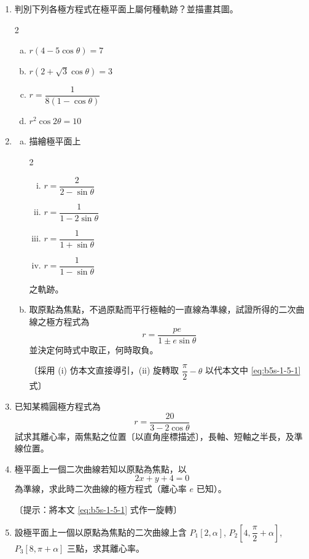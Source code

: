 \begin{enumerate}[1.]
  \item 判別下列各極方程式在極平面上屬何種軌跡？並描畫其圖。
  \begin{multicols}{2}
  \begin{enumerate}[(a)]
    \item $r(4 - 5\cos\theta) = 7$
    \item $r(2 + \sqrt{3}\cos\theta) = 3$
    \item $r = \dfrac{1}{8(1 - \cos\theta)}$
    \item $r^2\cos 2\theta = 10$
  \end{enumerate}
  \end{multicols}

  \item
  \begin{enumerate}[(a)]
    \item 描繪極平面上
    \begin{multicols}{2}
    \begin{enumerate}[(i)]
      \item $r = \dfrac{2}{2 - \sin\theta}$
      \item $r = \dfrac{1}{1 - 2\sin\theta}$
      \item $r = \dfrac{1}{1 + \sin\theta}$
      \item $r = \dfrac{1}{1 - \sin\theta}$
    \end{enumerate}
    \end{multicols}
    之軌跡。
    \item 取原點為焦點，不過原點而平行極軸的一直線為準線，試證所得的二次曲線之極方程式為
    \[
      r = \frac{pe}{1 \pm e\sin\theta}
    \]
    並決定何時式中取正，何時取負。

    〔採用 (i) 仿本文直接導引，(ii) 旋轉取 $\dfrac{\pi}{2} - \theta$ 以代本文中 \eqref{eq:b5s-1-5-1} 式〕
  \end{enumerate}

  \item 已知某橢圓極方程式為
  \[
    r = \frac{20}{3 - 2\cos\theta}
  \]
  試求其離心率，兩焦點之位置〔以直角座標描述〕，長軸、短軸之半長，及準線位置。

  \item 極平面上一個二次曲線若知以原點為焦點，以
  \[
    2x + y + 4 = 0
  \]
  為準線，求此時二次曲線的極方程式（離心率 $e$ 已知）。

  〔提示：將本文 \eqref{eq:b5s-1-5-1} 式作一旋轉〕

  \item 設極平面上一個以原點為焦點的二次曲線上含 $P_1[2, \alpha]$, $P_2\left[4, \dfrac{\pi}{2} + \alpha\right]$, $P_3[8, \pi + \alpha]$ 三點，求其離心率。


\end{enumerate}
